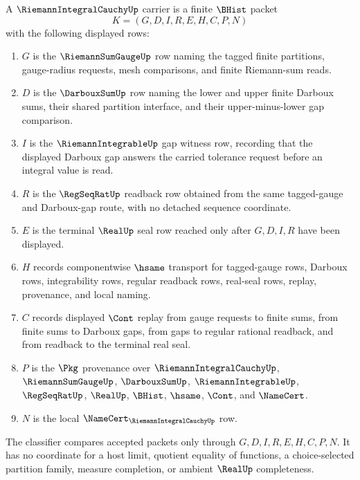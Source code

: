 \begin{definition}
\label{def:riemann-integral-cauchy-carrier}
A $\RiemannIntegralCauchyUp$ carrier is a finite $\BHist$ packet
$$
K=(G,D,I,R,E,H,C,P,N)
$$
with the following displayed rows:
\begin{enumerate}
\item $G$ is the $\RiemannSumGaugeUp$ row naming the tagged finite partitions, gauge-radius requests, mesh comparisons, and finite Riemann-sum reads.
\item $D$ is the $\DarbouxSumUp$ row naming the lower and upper finite Darboux sums, their shared partition interface, and their upper-minus-lower gap comparison.
\item $I$ is the $\RiemannIntegrableUp$ gap witness row, recording that the displayed Darboux gap answers the carried tolerance request before an integral value is read.
\item $R$ is the $\RegSeqRatUp$ readback row obtained from the same tagged-gauge and Darboux-gap route, with no detached sequence coordinate.
\item $E$ is the terminal $\RealUp$ seal row reached only after $G,D,I,R$ have been displayed.
\item $H$ records componentwise $\hsame$ transport for tagged-gauge rows, Darboux rows, integrability rows, regular readback rows, real-seal rows, replay, provenance, and local naming.
\item $C$ records displayed $\Cont$ replay from gauge requests to finite sums, from finite sums to Darboux gaps, from gaps to regular rational readback, and from readback to the terminal real seal.
\item $P$ is the $\Pkg$ provenance over $\RiemannIntegralCauchyUp$, $\RiemannSumGaugeUp$, $\DarbouxSumUp$, $\RiemannIntegrableUp$, $\RegSeqRatUp$, $\RealUp$, $\BHist$, $\hsame$, $\Cont$, and $\NameCert$.
\item $N$ is the local $\NameCert_{\RiemannIntegralCauchyUp}$ row.
\end{enumerate}
The classifier compares accepted packets only through $G,D,I,R,E,H,C,P,N$. It has no coordinate for a host limit, quotient equality of functions, a choice-selected partition family, measure completion, or ambient $\RealUp$ completeness.
\end{definition}

